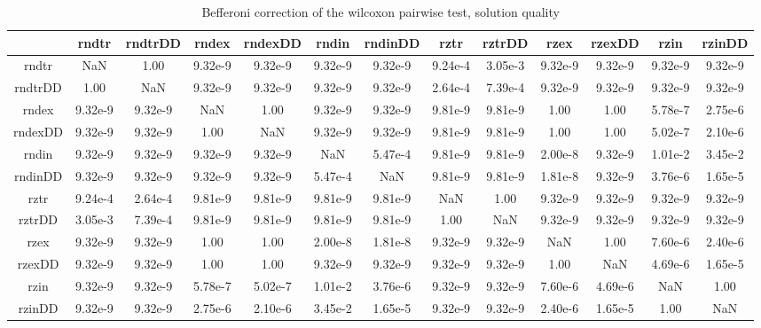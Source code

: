 \documentclass[12pt,a4paper]{article}
\begin{document}
\begin{table}[!h]
\leftskip -2.45cm
{
\footnotesize
\begin{tabular}{|*{13}{c|}}
\hline
~ & rndtr & rndtrDD & rndex & rndexDD & rndin & rndinDD & rztr & rztrDD & rzex & rzexDD & rzin & rzinDD \\
\hline
rndtr & NaN & 1.00 & 9.32e-9 & 9.32e-9 & 9.32e-9 & 9.32e-9 & 9.24e-4 & 3.05e-3 & 9.32e-9 & 9.32e-9 & 9.32e-9 & 9.32e-9 \\
rndtrDD & 1.00 & NaN & 9.32e-9 & 9.32e-9 & 9.32e-9 & 9.32e-9 & 2.64e-4 & 7.39e-4 & 9.32e-9 & 9.32e-9 & 9.32e-9 & 9.32e-9 \\
rndex & 9.32e-9 & 9.32e-9 & NaN & 1.00 & 9.32e-9 & 9.32e-9 & 9.81e-9 & 9.81e-9 & 1.00 & 1.00 & 5.78e-7 & 2.75e-6 \\
rndexDD & 9.32e-9 & 9.32e-9 & 1.00 & NaN & 9.32e-9 & 9.32e-9 & 9.81e-9 & 9.81e-9 & 1.00 & 1.00 & 5.02e-7 & 2.10e-6 \\
rndin & 9.32e-9 & 9.32e-9 & 9.32e-9 & 9.32e-9 & NaN & 5.47e-4 & 9.81e-9 & 9.81e-9 & 2.00e-8 & 9.32e-9 & 1.01e-2 & 3.45e-2 \\
rndinDD & 9.32e-9 & 9.32e-9 & 9.32e-9 & 9.32e-9 & 5.47e-4 & NaN & 9.81e-9 & 9.81e-9 & 1.81e-8 & 9.32e-9 & 3.76e-6 & 1.65e-5 \\
rztr & 9.24e-4 & 2.64e-4 & 9.81e-9 & 9.81e-9 & 9.81e-9 & 9.81e-9 & NaN & 1.00 & 9.32e-9 & 9.32e-9 & 9.32e-9 & 9.32e-9 \\
rztrDD & 3.05e-3 & 7.39e-4 & 9.81e-9 & 9.81e-9 & 9.81e-9 & 9.81e-9 & 1.00 & NaN & 9.32e-9 & 9.32e-9 & 9.32e-9 & 9.32e-9 \\
rzex & 9.32e-9 & 9.32e-9 & 1.00 & 1.00 & 2.00e-8 & 1.81e-8 & 9.32e-9 & 9.32e-9 & NaN & 1.00 & 7.60e-6 & 2.40e-6 \\
rzexDD & 9.32e-9 & 9.32e-9 & 1.00 & 1.00 & 9.32e-9 & 9.32e-9 & 9.32e-9 & 9.32e-9 & 1.00 & NaN & 4.69e-6 & 1.65e-5 \\
rzin & 9.32e-9 & 9.32e-9 & 5.78e-7 & 5.02e-7 & 1.01e-2 & 3.76e-6 & 9.32e-9 & 9.32e-9 & 7.60e-6 & 4.69e-6 & NaN & 1.00 \\
rzinDD & 9.32e-9 & 9.32e-9 & 2.75e-6 & 2.10e-6 & 3.45e-2 & 1.65e-5 & 9.32e-9 & 9.32e-9 & 2.40e-6 & 1.65e-5 & 1.00 & NaN \\
\hline
\end{tabular}
\normalsize
}
\caption{Befferoni correction of the wilcoxon pairwise test, solution quality}
\label{Befferoni correction of the wilcoxon pairwise test}
\end{table}
\end{document}
